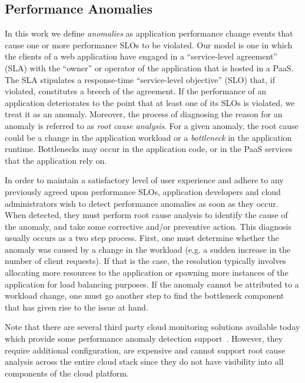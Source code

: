 \subsection{Performance Anomalies}
In this work we define \textit{anomalies} as application performance change events that cause
one or more performance SLOs to be violated. Our model is
one in which the clients of a web application have engaged in a
``service-level agreement'' (SLA)
with the ``owner'' or operator of the application that is hosted in a PaaS.  The SLA
stipulates a response-time ``service-level objective'' (SLO) that, if violated, constitutes a breech of the
agreement.
If the performance of an application deteriorates to the
point that at least one of its SLOs is violated, we treat it as an anomaly. Moreover, the process
of diagnosing the reason for 
an anomaly is referred to as \textit{root cause analysis}.
For a given anomaly, the root cause could be a change in the application workload or
a \textit{bottleneck} in the application runtime. Bottlenecks may occur in the application code, 
or in the PaaS services that the application rely on.

In order to maintain a satisfactory level of user experience and adhere to any previously
agreed upon performance SLOs, application developers and cloud administrators wish
to detect performance anomalies as soon as they occur. When detected, they
must perform root cause analysis to identify the cause of the anomaly, and take some
corrective and/or preventive action. 
This diagnosis usually occurs as a two step process. First, one must determine
whether the anomaly was caused by a change in the workload (e.g. a sudden 
increase in the number of client requests). If that is the case,
the resolution typically involves allocating more resources to the application or spawning
more instances of the application for load balancing purposes. If the anomaly cannot be 
attributed to a workload change, one must go another step to find the bottleneck component
that has given rise to the issue at hand.


Note that there are several
third party cloud monitoring solutions available today which provide some performance
anomaly detection support~\cite{newrelic,datadog,dynatrace}. 
However, they require additional configuration, are expensive
and cannot support root cause analysis across the entire cloud stack since they do not
have visibility into all components of the cloud
platform.
